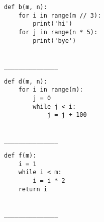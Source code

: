 \documentclass[twoside]{article}
\begin{document}
\begin{enumerate}
\begin{enumerate}
\begin{lstlisting}
def b(m, n):
    for i in range(m // 3):
        print('hi')
    for j in range(n * 5):
        print('bye')
\end{lstlisting}
~\\
\lstinline{_______________}

\begin{lstlisting}
def d(m, n):
    for i in range(m):
        j = 0
        while j < i:
            j = j + 100
\end{lstlisting}
~\\
\lstinline{_______________}

\begin{lstlisting}
def f(m):
    i = 1
    while i < m:
        i = i * 2
    return i
\end{lstlisting}
~\\
\lstinline{_______________}
\end{enumerate}

\end{enumerate}
\end{document}
